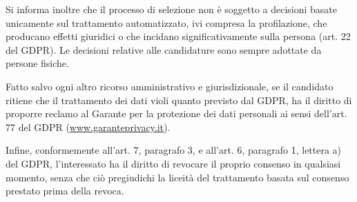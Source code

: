 \documentclass[legal]{polinetwork}
\begin{document}
Si informa inoltre che il processo di selezione non è soggetto a decisioni basate unicamente sul trattamento automatizzato, ivi compresa la profilazione, che producano effetti giuridici o che incidano significativamente sulla persona (art. 22 del GDPR). Le decisioni relative alle candidature sono sempre adottate da persone fisiche.

Fatto salvo ogni altro ricorso amministrativo e giurisdizionale, se il candidato ritiene che il trattamento dei dati violi quanto previsto dal GDPR, ha il diritto di proporre reclamo al Garante per la protezione dei dati personali ai sensi dell’art. 77 del GDPR (\href{https://www.garanteprivacy.it}{www.garanteprivacy.it}).

Infine, conformemente all’art. 7, paragrafo 3, e all’art. 6, paragrafo 1, lettera a) del GDPR, l’interessato ha il diritto di revocare il proprio consenso in qualsiasi momento, senza che ciò pregiudichi la liceità del trattamento basata sul consenso prestato prima della revoca.
\end{document}
